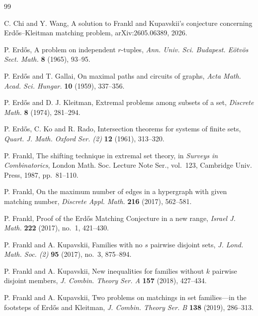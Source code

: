 \documentclass[10pt,a4paper]{article}
\numberwithin{equation}{section}
\theoremstyle{definition}
\begin{document}
\begin{thebibliography}{99}

        C. Chi and Y. Wang,
        A solution to Frankl and Kupavskii's conjecture concerning Erd\H{o}s--Kleitman matching problem,
        arXiv:2605.06389, 2026.

        P. Erd\H{o}s,
        A problem on independent $r$-tuples,
        \emph{Ann. Univ. Sci. Budapest. E\"otv\"os Sect. Math.} {\bf 8} (1965), 93--95.

        P. Erd\H{o}s and T. Gallai,
        On maximal paths and circuits of graphs,
        \emph{Acta Math. Acad. Sci. Hungar.} \textbf{10} (1959), 337--356.

        P. Erd\H{o}s and D. J. Kleitman,
        Extremal problems among subsets of a set,
        \emph{Discrete Math.} \textbf{8} (1974), 281--294.

        P. Erd\H{o}s, C. Ko and R. Rado,
        Intersection theorems for systems of finite sets,
        \emph{Quart. J. Math. Oxford Ser. (2)} {\bf 12} (1961), 313--320.



        P. Frankl,
        The shifting technique in extremal set theory,
        in \emph{Surveys in Combinatorics}, London Math. Soc. Lecture Note Ser.,
        vol.~123, Cambridge Univ. Press, 1987, pp.~81--110.

        P. Frankl,
        On the maximum number of edges in a hypergraph with given matching number,
        \emph{Discrete Appl. Math.} \textbf{216} (2017), 562--581.

        P. Frankl,
        Proof of the Erd\H{o}s Matching Conjecture in a new range,
        \emph{Israel J. Math.} \textbf{222} (2017), no.~1, 421--430.

        P. Frankl and A. Kupavskii,
        Families with no $s$ pairwise disjoint sets,
        \emph{J. Lond. Math. Soc. (2)} {\bf 95} (2017), no.~3, 875--894.

        P. Frankl and A. Kupavskii,
        New inequalities for families without $k$ pairwise disjoint members,
        \emph{J. Combin. Theory Ser. A} \textbf{157} (2018), 427--434.

        P. Frankl and A. Kupavskii,
        Two problems on matchings in set families---in the footsteps of Erd\H{o}s and Kleitman,
        \emph{J. Combin. Theory Ser. B} \textbf{138} (2019), 286--313.


\end{thebibliography}
\end{document}

